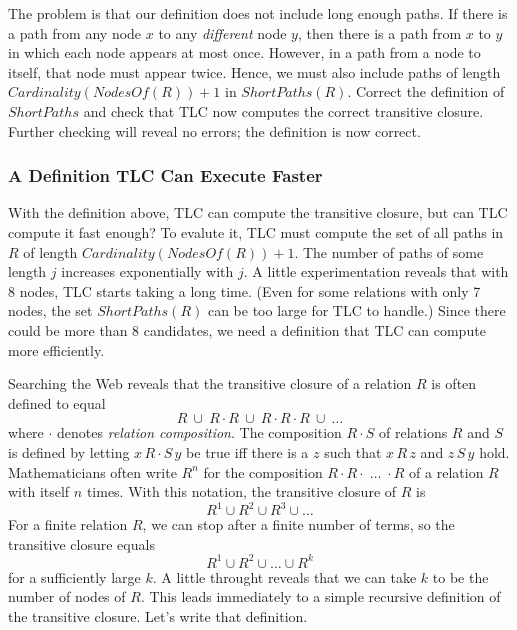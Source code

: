 \documentclass[fleqn,leqno]{article}
\begin{document}
The problem is that our definition does not include long enough paths.
If there is a path from any node $x$ to any \emph{different} node $y$,
then there is a path from $x$ to $y$ in which each node appears at
most once.  However, in a path from a node to itself, that node must
appear twice.  Hence, we must also include paths of length
$Cardinality(NodesOf(R))+1$ in $ShortPaths(R)$.  Correct the
definition of $ShortPaths$ and check that TLC now computes the correct
transitive closure.  Further checking will reveal no errors; the
definition is now correct.

\subsubsection{A Definition TLC Can Execute Faster} 

With the definition above, TLC can compute the transitive closure, but
can TLC compute it fast enough?  To evalute it, TLC must compute the
set of all paths in $R$ of length $Cardinality(NodesOf(R))+1$.  The
number of paths of some length $j$ increases exponentially with $j$.
A little experimentation reveals that with 8 nodes, TLC starts taking
a long time.  (Even for some relations with only 7 nodes, the set
$ShortPaths(R)$ can be too large for TLC to handle.)  Since there
could be more than 8 candidates, we need a definition that TLC can
compute more efficiently.

Searching the Web reveals that the transitive closure of a relation
$R$ is often defined to equal
 \[ R \ \cup\  R \!\cdot\! R \ \cup\  R \!\cdot\! R \!\cdot\! R \ \cup\  \ldots
 \]
where $\cdot$ denotes 
\emph{relation composition}.  The composition
$R\!\cdot\!S$ of relations $R$ and $S$ is defined by letting
$x\,R\!\cdot\! S\,y$ be true iff there is a $z$ such that $x\,R\,z$
and $z\,S\,y$ hold.  Mathematicians often write $R^{n}$ for the composition
  $R \cdot R \cdot\;\ldots\; \cdot R$ 
of a relation $R$ with itself $n$ times.  With this notation, the
transitive closure of $R$ is
  \[ R^{1} \cup R^{2} \cup R^{3} \cup \ldots
 \]
For a finite relation $R$, we can stop after a finite number of terms,
so the transitive closure equals
 \[ R^{1} \cup R^{2} \cup \ldots \cup R^{k}
 \]
for a sufficiently large $k$.  A little throught reveals that
we can take $k$ to be the number of nodes of $R$.  This leads immediately
to a simple recursive definition of the transitive closure.  Let's
write that definition.
\end{document}
